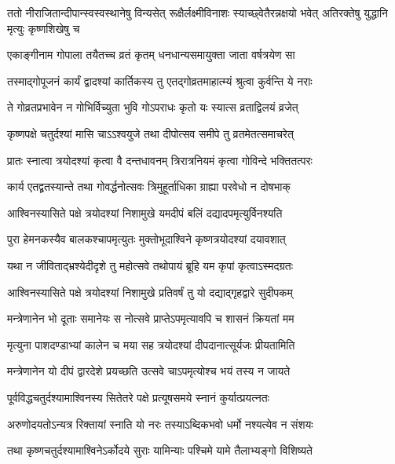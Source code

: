 \threelineshloka
{ततो नीराजितान्दीपान्स्वस्वस्थानेषु विन्यसेत्}
{रूक्षैर्लक्ष्मीविनाशः स्याच्छ्वेतैरन्नक्षयो भवेत्}
{अतिरक्तेषु युद्धानि मृत्युः कृष्णशिखेषु च} %

\twolineshloka
{एकाङ्गीनाम गोपाला तयैतच्च व्रतं कृतम्}
{धनधान्यसमायुक्ता जाता वर्षत्रयेण सा} %

\twolineshloka
{तस्माद्गोपूजनं कार्यं द्वादश्यां कार्तिकस्य तु}
{एतद्गोव्रतमाहात्म्यं श्रुत्वा कुर्वन्ति ये नराः} %

\twolineshloka
{ते गोव्रतप्रभावेन न गोभिर्विच्युता भुवि}
{गोऽपराधः कृतो यः स्यात्स व्रताद्विलयं व्रजेत्} %


\twolineshloka
{कृष्णपक्षे चतुर्दश्यां मासि चाऽऽश्वयुजे तथा}
{दीपोत्सव समीपे तु व्रतमेतत्समाचरेत्} %

\twolineshloka
{प्रातः स्नात्वा त्रयोदश्यां कृत्वा वै दन्तधावनम्}
{त्रिरात्रनियमं कृत्वा गोविन्दे भक्तितत्परः} %

\twolineshloka
{कार्य एतद्व्रतस्यान्ते तथा गोवर्द्धनोत्सवः}
{त्रिमुहूर्ताधिका ग्राह्या परवेधो न दोषभाक्} %

\twolineshloka
{आश्विनस्यासिते पक्षे त्रयोदश्यां निशामुखे}
{यमदीपं बलिं दद्यादपमृत्युर्विनश्यति} %

\twolineshloka
{पुरा हेमनकस्यैव बालकश्चापमृत्युतः}
{मुक्तोभूदाश्विने कृष्णत्रयोदश्यां दयावशात्} %

\twolineshloka
{यथा न जीविताद्भ्रश्येदीदृशे तु महोत्सवे}
{तथोपायं ब्रूहि यम कृपां कृत्वाऽस्मदग्रतः} %


\twolineshloka
{आश्विनस्यासिते पक्षे त्रयोदश्यां निशामुखे}
{प्रतिवर्षं तु यो दद्याद्गृहद्वारे सुदीपकम्} %

\twolineshloka
{मन्त्रेणानेन भो दूताः समानेयः स नोत्सवे}
{प्राप्तेऽपमृत्यावपि च शासनं क्रियतां मम} %

\twolineshloka
{मृत्युना पाशदण्डाभ्यां कालेन च मया सह}
{त्रयोदश्यां दीपदानात्सूर्यजः प्रीयतामिति} %

\twolineshloka
{मन्त्रेणानेन यो दीपं द्वारदेशे प्रयच्छति}
{उत्सवे चाऽपमृत्योश्च भयं तस्य न जायते} %


\twolineshloka
{पूर्वविद्धचतुर्दश्यामाश्विनस्य सितेतरे}
{पक्षे प्रत्यूषसमये स्नानं कुर्यात्प्रयत्नतः} %

\twolineshloka
{अरुणोदयतोऽन्यत्र रिक्तायां स्नाति यो नरः}
{तस्याऽब्दिकभवो धर्मो नश्यत्येव न संशयः} %

\twolineshloka
{तथा कृष्णचतुर्दश्यामाश्विनेऽर्कोदये सुराः}
{यामिन्याः पश्चिमे यामे तैलाभ्यङ्गो विशिष्यते} %

